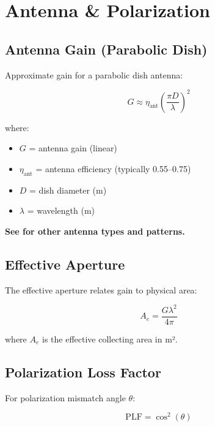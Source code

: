\section{Antenna \& Polarization}
\label{sec:antenna-polarization}

\subsection{Antenna Gain (Parabolic Dish)}
\label{subsec:antenna-gain}

Approximate gain for a parabolic dish antenna:

\begin{equation}
\label{eq:antenna-gain}
G \approx \eta_{\text{ant}} \left(\frac{\pi D}{\lambda}\right)^2
\end{equation}

where:
\begin{itemize}
\item $G$ = antenna gain (linear)
\item $\eta_{\text{ant}}$ = antenna efficiency (typically 0.55--0.75)
\item $D$ = dish diameter (m)
\item $\lambda$ = wavelength (m)
\end{itemize}

\textbf{See  for other antenna types and patterns.}

\subsection{Effective Aperture}
\label{subsec:effective-aperture}

The effective aperture relates gain to physical area:

\begin{equation}
\label{eq:effective-aperture}
A_e = \frac{G\lambda^2}{4\pi}
\end{equation}

where $A_e$ is the effective collecting area in m².

\subsection{Polarization Loss Factor}
\label{subsec:polarization-loss}

For polarization mismatch angle $\theta$:

\begin{equation}
\label{eq:polarization-loss-linear}
\text{PLF} = \cos^2(\theta)
\end{equation}

